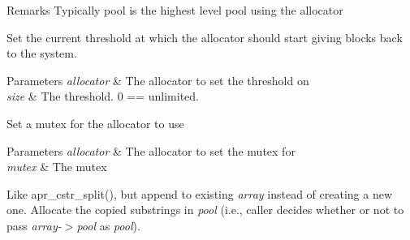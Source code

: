 \begin{DoxyRemark}{Remarks}
Typically pool is the highest level pool using the allocator
\end{DoxyRemark}
Set the current threshold at which the allocator should start giving blocks back to the system. 
\begin{DoxyParams}{Parameters}
{\em allocator} & The allocator to set the threshold on \\
\hline
{\em size} & The threshold. 0 == unlimited.\\
\hline
\end{DoxyParams}
Set a mutex for the allocator to use 
\begin{DoxyParams}{Parameters}
{\em allocator} & The allocator to set the mutex for \\
\hline
{\em mutex} & The mutex\\
\hline
\end{DoxyParams}
Like apr\+\_\+cstr\+\_\+split(), but append to existing {\itshape array} instead of creating a new one. Allocate the copied substrings in {\itshape pool} (i.\+e., caller decides whether or not to pass {\itshape array-\/$>$pool} as {\itshape pool}).

